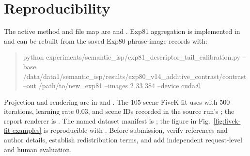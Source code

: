 \documentclass[journal]{IEEEtran}
\begin{document}
\section{Reproducibility}
The active method and file map are  and . Exp81 aggregation is implemented in  and can be rebuilt from the saved Exp80 phrase-image records with:
\begin{quote}\footnotesize\ttfamily
python experiments/semantic\_isp/exp81\_descriptor\_tail\_calibration.py --base /data/data1/semantic\_isp/results/exp80\_v14\_additive\_contrast/contrast --out /path/to/new\_exp81 --images 2 33 384 --device cuda:0
\end{quote}
Projection and rendering are in  and . The 105-scene FiveK fit uses  with 500 iterations, learning rate 0.03, and scene IDs recorded in the source run's ; the report renderer is . The named dataset manifest is ; the figure in Fig.~\ref{fig:fivek-fit-examples} is reproducible with . Before submission, verify references and author details, establish redistribution terms, and add independent request-level and human evaluation.
\end{document}
